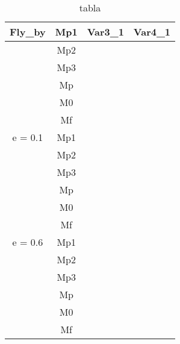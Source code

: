 \begin{table}[H] 
\centering 
\captionsetup{justification=centering,margin=10mm} 
\caption{tabla} 
	{\renewcommand{\arraystretch}{1.2} 
	\begin{tabular}{cccc} 
		Fly_by & Mp1 & Var3_1 & Var4_1 \\ 
		\hline 
		 & Mp2 &  &  \\ 
		 & Mp3 &  &  \\ 
		 & Mp &  &  \\ 
		 & M0 &  &  \\ 
		 & Mf &  &  \\ 
		e = 0.1 & Mp1 &  &  \\ 
		 & Mp2 &  &  \\ 
		 & Mp3 &  &  \\ 
		 & Mp &  &  \\ 
		 & M0 &  &  \\ 
		 & Mf &  &  \\ 
		e = 0.6 & Mp1 &  &  \\ 
		 & Mp2 &  &  \\ 
		 & Mp3 &  &  \\ 
		 & Mp &  &  \\ 
		 & M0 &  &  \\ 
		 & Mf &  &  \\ 
		\hline 
	\end{tabular} 
	} 
\label{tab:tabla} 
\end{table}